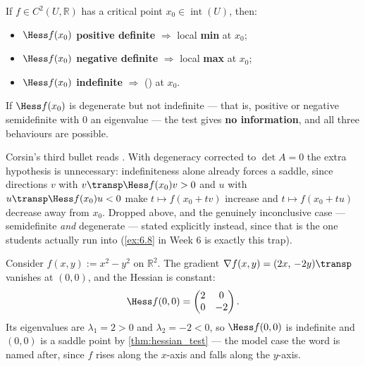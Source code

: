 \begin{theorem}
\label{thm:hessian_test}
If $f \in C^2(U,\mathbb{R})$ has a critical point $x_0 \in \operatorname{int}(U)$, then:
\begin{itemize}
  \item $\Hess f(x_0)$ \textbf{positive definite} $\Rightarrow$ local \textbf{min} at $x_0$;
  \item $\Hess f(x_0)$ \textbf{negative definite} $\Rightarrow$ local \textbf{max} at $x_0$;
  \item $\Hess f(x_0)$ \textbf{indefinite} $\Rightarrow$ 
    () at $x_0$.
\end{itemize}
If $\Hess f(x_0)$ is degenerate but not indefinite --- that is, positive or negative
semidefinite with $0$ an eigenvalue --- the test gives \textbf{no information}, and all three
behaviours are possible.
\end{theorem}

\begin{ainote}
Corsin's third bullet reads . With degeneracy corrected to
$\det A = 0$ the extra hypothesis is unnecessary: indefiniteness alone already forces a saddle,
since directions $v$ with $v\transp\Hess f(x_0)v > 0$ and $u$ with $u\transp\Hess f(x_0)u < 0$
make $t\mapsto f(x_0+tv)$ increase and $t\mapsto f(x_0+tu)$ decrease away from $x_0$. Dropped
above, and the genuinely inconclusive case --- semidefinite \emph{and} degenerate --- stated
explicitly instead, since that is the one students actually run into
(\cref{ex:6.8} in Week 6 is exactly this trap).
\end{ainote}

\begin{aiexample}
\label{ex:ai_saddle_via_hessian}
Consider $f(x,y) := x^2-y^2$ on $\mathbb{R}^2$. The gradient
$\nabla f(x,y) = (2x,\,-2y)\transp$ vanishes at $(0,0)$, and the Hessian is constant:
\[
\Hess f(0,0) = \begin{pmatrix} 2 & 0 \\ 0 & -2 \end{pmatrix}.
\]
Its eigenvalues are $\lambda_1 = 2 > 0$ and $\lambda_2 = -2 < 0$, so $\Hess f(0,0)$ is
indefinite and $(0,0)$ is a saddle point by \cref{thm:hessian_test} --- the model case the word
 is named after, since $f$ rises along the $x$-axis and falls along the $y$-axis.
\end{aiexample}

